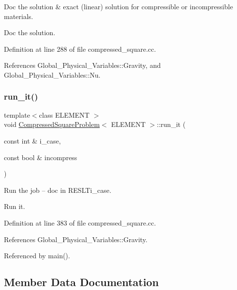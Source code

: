 Doc the solution \& exact (linear) solution for compressible or incompressible materials. 

Doc the solution. 

Definition at line 288 of file compressed\+\_\+square.\+cc.



References Global\+\_\+\+Physical\+\_\+\+Variables\+::\+Gravity, and Global\+\_\+\+Physical\+\_\+\+Variables\+::\+Nu.

\mbox{\label{classCompressedSquareProblem_a1543bb8bcba7bf3491e29d141faaf774}} 
\subsubsection{\texorpdfstring{run\+\_\+it()}{run\_it()}}
{\footnotesize\ttfamily template$<$class E\+L\+E\+M\+E\+NT $>$ \\
void \hyperlink{classCompressedSquareProblem}{Compressed\+Square\+Problem}$<$ E\+L\+E\+M\+E\+NT $>$\+::run\+\_\+it (\begin{DoxyParamCaption}\item[{const int \&}]{i\+\_\+case,  }\item[{const bool \&}]{incompress }\end{DoxyParamCaption})}



Run the job -- doc in R\+E\+S\+L\+Ti\+\_\+case. 

Run it. 

Definition at line 383 of file compressed\+\_\+square.\+cc.



References Global\+\_\+\+Physical\+\_\+\+Variables\+::\+Gravity.



Referenced by main().



\subsection{Member Data Documentation}
\mbox{\label{classCompressedSquareProblem_a2269691c7bef351c87a4421d275fe7c3}} 

